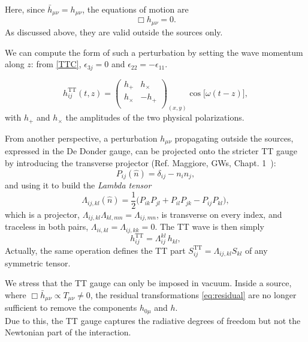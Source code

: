 \documentclass[12pt,a4paper,oneside]{article}
\numberwithin{equation}{section}   %
\begin{document}
Here, since $\bar h_{\mu\nu}=h_{\mu\nu}$, the equations of motion are
\begin{equation}
  \boxed{\Box h_{\mu\nu}=0.}
\end{equation}
As discussed above, they are valid outside the sources only.

We can compute the form of such a perturbation by setting
the wave momentum along $z$: from \eqref{TTC}, $\epsilon_{3j}=0$ and
 $\epsilon_{22}=-\epsilon_{11}$. 
 
\begin{equation}\boxed{
  h^{\mathrm{TT}}_{ij}(t,z)=
  \begin{pmatrix}
    h_+ & h_\times \\
    h_\times & -h_+ \\
  \end{pmatrix}_{(x,y)}
  \cos\!\bigl[\omega(t-z)\bigr],
  \label{eq:TT-wave}}
\end{equation}
with $h_+$ and $h_\times$ the amplitudes of the two physical polarizations.


From another perspective,
 a perturbation $h_{\mu\nu}$ propagating outside the sources, expressed
in the De Donder gauge, can be projected onto
the stricter TT gauge by introducing
 the transverse projector  (Ref. Maggiore, GWs, Chapt. 1~\cite{Maggiore2008}):
\begin{equation}
P_{ij}(\hat n)=\delta_{ij}-n_in_j ,
\label{TTPs}
\end{equation}
and using it to build the \textit{Lambda tensor}
\begin{equation}
\Lambda_{ij,kl}(\hat n)=\frac12\bigl(P_{ik}P_{jl}+P_{il}P_{jk}-P_{ij}P_{kl}\bigr),
\label{TTP}
\end{equation}
which is a projector, $\Lambda_{ij,kl}\Lambda_{kl,mn}=\Lambda_{ij,mn}$,
is transverse on every index, and traceless in both pairs,
$\Lambda_{ii,kl}=\Lambda_{ij,kk}=0$. The TT wave is then simply
\begin{equation}
\boxed{h^{\mathrm{TT}}_{ij}=\Lambda_{ij}^{kl}\,h_{kl}} ,
\label{eq:TT-proj}
\end{equation}
Actually, the same operation defines the TT part
$S^{\mathrm{TT}}_{ij}=\Lambda_{ij,kl}S_{kl}$ of any symmetric tensor.

We stress that the TT gauge can only be imposed in vacuum. Inside a source,
where $\Box\bar h_{\mu\nu}\propto T_{\mu\nu}\neq0$, the residual
transformations \eqref{eq:residual} are no longer sufficient to remove the
components $h_{0\mu}$ and $h$. \\
Due to this, the TT gauge captures the
radiative degrees of freedom but not the Newtonian part of the interaction.
\end{document}
